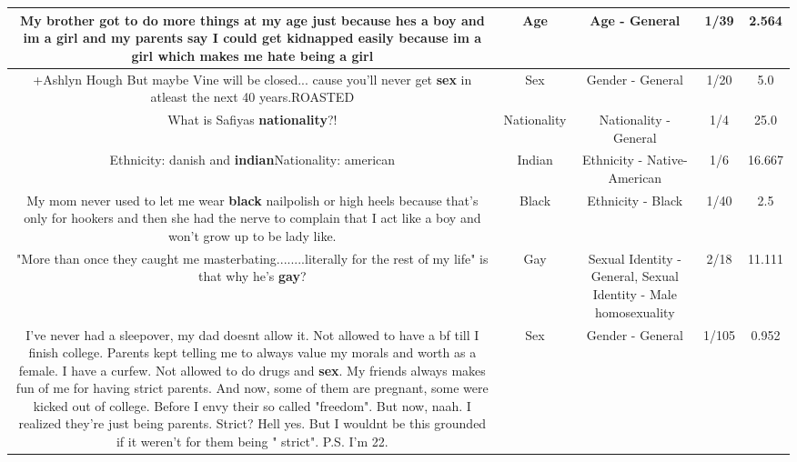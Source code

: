\documentclass[11pt]{article}
\newlength\mylength
\begin{document}
\begin{center}
\begin{longtable}{|C{.65\mylength}|C{.30\mylength}|C{.12\mylength}|C{.12\mylength}|C{.12\mylength}|}
  \small My brother got to do more things at my \textbf{age} just because hes a boy and im a girl and my parents say I could get kidnapped easily because im a girl which makes me hate being a girl\normalsize   & Age & Age - General & 1/39 & 2.564 \\  \hline
  \small +Ashlyn Hough But maybe Vine will be closed... cause you'll never get \textbf{sex} in atleast the next 40 years.ROASTED\normalsize   & Sex & Gender - General & 1/20 & 5.0 \\  \hline
  \small What is Safiyas \textbf{nationality}?!\normalsize   & Nationality & Nationality - General & 1/4 & 25.0 \\  \hline
  \small Ethnicity: danish and \textbf{indian}Nationality: american\normalsize   & Indian & Ethnicity - Native-American & 1/6 & 16.667 \\  \hline
  \small My mom never used to let me wear \textbf{black} nailpolish or high heels because that's only for hookers and then she had the nerve to complain that I act like a boy and won't grow up to be lady like.\normalsize   & Black & Ethnicity - Black & 1/40 & 2.5 \\  \hline
  \small "More than once they caught me masterbating........literally for the rest of my life" is that why he's \textbf{g\textbf{ay}}?\normalsize   & Gay & Sexual Identity - General, Sexual Identity - Male homosexuality & 2/18 & 11.111 \\  \hline
  \small I've never had a sleepover, my dad doesnt allow it. Not allowed to have a bf till I finish college. Parents kept telling me to always value my morals and worth as a female. I have a curfew. Not allowed to do drugs and \textbf{sex}. My friends always makes fun of me for having strict parents. And now, some of them are pregnant, some were kicked out of college. Before I envy their so called "freedom". But now, naah. I realized they're just being parents. Strict? Hell yes. But I wouldnt be this grounded if it weren't for them being " strict". P.S. I'm 22.\normalsize   & Sex & Gender - General & 1/105 & 0.952 \\  \hline

\end{longtable}
\end{center}
\end{document}

